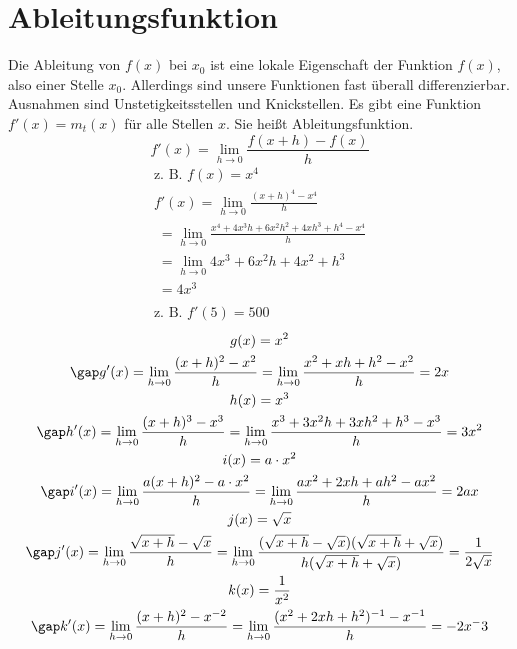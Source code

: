\section{Ableitungsfunktion}
Die Ableitung von $f(x)$ bei $x_0$ ist eine lokale Eigenschaft der Funktion $f(x)$, also einer Stelle $x_0$. Allerdings sind unsere Funktionen fast überall differenzierbar. Ausnahmen sind Unstetigkeitsstellen und Knickstellen. Es gibt eine Funktion $f'(x) = m_t(x)$ für alle Stellen $x$. Sie heißt Ableitungsfunktion.
$$f'(x) = \lim\limits_{h \to 0} \frac{f(x + h) - f(x)}{h}$$
\begin{gather*}
  \text{z. B. } f(x) = x^4 \\
  f'(x) = \lim\limits_{h \to 0} \frac{(x + h)^4 - x^4}{h} \\
  \;= \lim\limits_{h \to 0} \frac{x^4 + 4x^3h + 6x^2h^2 + 4xh^3 + h^4 - x^4}{h} \\
  \;= \lim\limits_{h \to 0} 4x^3 + 6x^2h + 4x^2 + h^3 \\
  \;= 4x^3 \\\\
  \text{z. B. } f'(5) = 500
\end{gather*}
\begin{gather*}
  g(x) = x^2 \\
  \gap g'(x) = \lim\limits_{h \to 0} \frac{(x + h)^2 - x^2}{h} = \lim\limits_{h \to 0} \frac{x^2 + xh + h^2 - x^2}{h} = 2x \\
  h(x) = x^3 \\
  \gap h'(x) = \lim\limits_{h \to 0} \frac{(x + h)^3 - x^3}{h} = \lim\limits_{h \to 0} \frac{x^3 + 3x^2h + 3xh^2 + h^3 - x^3}{h} = 3x^2 \\
  i(x) = a \cdot x^2 \\
  \gap i'(x) = \lim\limits_{h \to 0} \frac{a(x + h)^2 - a \cdot x^2}{h} = \lim\limits_{h \to 0} \frac{ax^2 + 2xh + ah^2 - ax^2}{h} = 2ax \\
  j(x) = \sqrt{x} \\
  \gap j'(x) = \lim\limits_{h \to 0} \frac{\sqrt{x + h} - \sqrt{x}}{h} = \lim\limits_{h \to 0} \frac{(\sqrt{x + h} - \sqrt{x})(\sqrt{x + h} + \sqrt{x})}{h(\sqrt{x + h} + \sqrt{x})} = \frac{1}{2\sqrt{x}} \\
  k(x) = \frac{1}{x^2} \\
  \gap k'(x) = \lim\limits_{h \to 0} \frac{(x + h)^2 - x^{-2}}{h} = \lim\limits_{h \to 0} \frac{(x^2 + 2xh + h^2)^{-1} - x^{-1}}{h} = -2x^-3  
\end{gather*} \\\\

